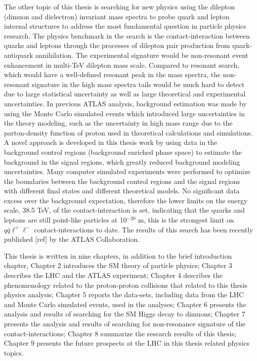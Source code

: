  The other topic of this thesis is searching for new physics using the dilepton (dimuon and dielectron) invariant mass spectra 
 to probe quark and lepton internal structures to address the most fundamental question in particle physics research. 
 The physics benchmark in the search is the contact-interaction between quarks and leptons through the processes of dilepton pair production 
 from quark-antiquark annihilation. The experimental signature would be non-resonant event enhancement in multi-TeV dilepton mass scale. 
 Compared to resonant search, which would have a well-defined resonant peak in the mass spectra, the non-resonant signature in the high mass spectra tails 
 would be much hard to detect due to large statistical uncertainty as well as large theoretical and experimental uncertainties. 
 In previous ATLAS analysis, background estimation was made by using the Monte Carlo simulated events which introduced large uncertainties 
 in the theory modeling, such as the uncertainty in high mass range due to the parton-density function of proton used in theoretical calculations and simulations.  
 A novel approach is developed in this thesis work
 by using data in the background control regions (background enriched phase space) to estimate the background in the signal regions, 
 which greatly reduced background modeling uncertainties. Many computer simulated experiments were performed to optimize the boundaries 
 between the background control regions and the signal regions with different final states and different theoretical models.
 No significant data excess over the background expectation, therefore the lower limits on the energy scale, 38.5 TeV, of the contact-interaction is set, 
 indicating that the quarks and leptons are still point-like particles at 10$^{-20}$ m, 
 this is the strongest limit on $q\bar q \ell^+\ell^-$ contact-interactions to date.
 The results of this search has been recently published [ref] by the ATLAS Collaboration.
 
This thesis is written in nine chapters, in addition to the brief introduction chapter,
Chapter 2 introduces the SM theory of particle physics;
Chapter 3 describes the LHC and the ATLAS experiment;
Chapter 4 describes the phenomenology related to the proton-proton collisions that related to this thesis physics analysis;
Chapter 5 reports the data-sets, including data from the LHC and Monte Carlo simulated events, used in the analyses;
Chapter 6 presents the analysis and results of searching for the SM Higgs decay to dimuons;
Chapter 7 presents the analysis and results of searching for non-resonance signature of the contact-interactions;
Chapter 8 summarize the research results of this thesis;
Chapter 9 presents the future prospects at the LHC in this thesis related physics topics.
 
